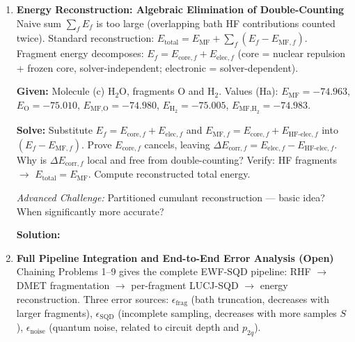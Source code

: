 \documentclass[fontset=mac]{ctexart}
\begin{document}
\begin{enumerate}
    \emph{Advanced Challenge:} How is DMET's self-consistent $\mu$ determined? Oneshot vs.\ self-consistent DMET trade-offs?

    \textbf{Solution:}
    \begin{enumerate}[label=(\alph*)]
        \item
        \item
        \item
    \end{enumerate}

    \item \textbf{Energy Reconstruction: Algebraic Elimination of Double-Counting} \\ Naive sum $\sum_f E_f$ is too large (overlapping bath HF contributions counted twice). Standard reconstruction: $E_{\text{total}} = E_{\text{MF}} + \sum_f (E_f - E_{\text{MF},f})$. Fragment energy decomposes:  $E_f = E_{\text{core},f} + E_{\text{elec},f}$ (core = nuclear repulsion + frozen core, solver-independent; electronic = solver-dependent).

    \textbf{Given:} Molecule (c) H$_2$O, fragments O and H$_2$. Values (Ha): $E_{\text{MF}}{=}{-}74.963$, $E_{\text{O}}{=}{-}75.010$, $E_{\text{MF,O}}{=}{-}74.980$, $E_{\text{H}_2}{=}{-}75.005$, $E_{\text{MF,H}_2}{=}{-}74.983$.

    \textbf{Solve:} Substitute $E_f = E_{\text{core},f} + E_{\text{elec},f}$ and $E_{\text{MF},f} = E_{\text{core},f} + E_{\text{HF-elec},f}$ into $(E_f - E_{\text{MF},f})$. Prove $E_{\text{core},f}$ cancels, leaving $\Delta E_{\text{corr},f} = E_{\text{elec},f} - E_{\text{HF-elec},f}$. Why is $\Delta E_{\text{corr},f}$ local and free from double-counting? Verify: HF fragments $\to$ $E_{\text{total}} = E_{\text{MF}}$. Compute reconstructed total energy.

    \emph{Advanced Challenge:} Partitioned cumulant reconstruction --- basic idea? When significantly more accurate?

    \textbf{Solution:}

    \vspace{2em}

    \item \textbf{Full Pipeline Integration and End-to-End Error Analysis (Open)} \\ Chaining Problems 1--9 gives the complete EWF-SQD pipeline: RHF $\to$ DMET fragmentation $\to$ per-fragment LUCJ-SQD $\to$ energy reconstruction. Three error sources: $\epsilon_{\text{frag}}$ (bath truncation, decreases with larger fragments), $\epsilon_{\text{SQD}}$ (incomplete sampling, decreases with more samples $S$), $\epsilon_{\text{noise}}$ (quantum noise, related to circuit depth and $p_{2q}$).


\end{enumerate}
\end{document}
